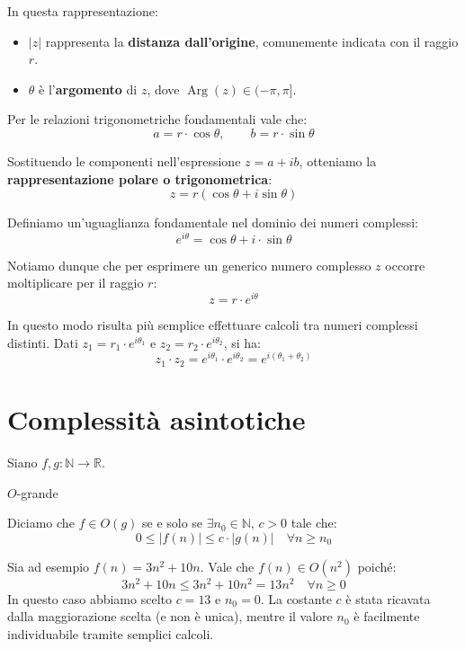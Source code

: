 \documentclass[12pt]{report}
\newcommand{\N}{\mathbb{N}}
\newcommand{\R}{\mathbb{R}}
\begin{document}
	In questa rappresentazione:
	\begin{itemize}
		
		\item $|z|$ rappresenta la \textbf{distanza dall'origine}, comunemente indicata con il raggio $r$.
		
		\item $\theta$ è l'\textbf{argomento} di $z$, dove $\operatorname{Arg}(z) \in (-\pi, \pi]$.
		
	\end{itemize}
	
	Per le relazioni trigonometriche fondamentali vale che:
	\[
	a = r \cdot \cos\theta, \qquad b = r \cdot \sin\theta
	\]
	
	Sostituendo le componenti nell'espressione $z = a + ib$, otteniamo la \textbf{rappresentazione polare o trigonometrica}:
	\[
	z = r(\cos\theta + i\sin\theta)
	\]
	
	Definiamo un'uguaglianza fondamentale nel dominio dei numeri complessi:
	\[
	e^{i\theta} = \cos\theta + i \cdot \sin\theta
	\]
	
	Notiamo dunque che per esprimere un generico numero complesso $z$ occorre moltiplicare per il raggio $r$:
	\[
	z = r \cdot e^{i\theta}
	\]
	
	In questo modo risulta più semplice effettuare calcoli tra numeri complessi distinti. Dati $z_1 = r_1 \cdot e^{i\theta_1}$ e $z_2 = r_2 \cdot e^{i\theta_2}$, si ha:
	\[
	z_1 \cdot z_2 = e^{i\theta_1} \cdot e^{i\theta_2} = e^{i(\theta_1 + \theta_2)}
	\]
	
	\chapter{Complessità asintotiche}
	
	Siano $f, g: \N \to \R$.
	
	\begin{definizione}{$O$-grande}{}
		
		Diciamo che $f \in O(g)$ se e solo se $\exists n_0 \in \N, \, c > 0$ tale che:
		\[
		0 \leq |f(n)| \leq c \cdot |g(n)| \quad \forall n \geq n_0
		\]
		
	\end{definizione}
	
	Sia ad esempio $f(n) = 3n^2 + 10n$. Vale che $f(n) \in O(n^2)$ poiché:
	\[
	3n^2 + 10n \leq 3n^2 + 10n^2 = 13n^2 \quad \forall n \geq 0
	\]
	In questo caso abbiamo scelto $c = 13$ e $n_0 = 0$. La costante $c$ è stata ricavata dalla maggiorazione scelta (e non è unica), mentre il valore $n_0$ è facilmente individuabile tramite semplici calcoli.
	
\end{document}
